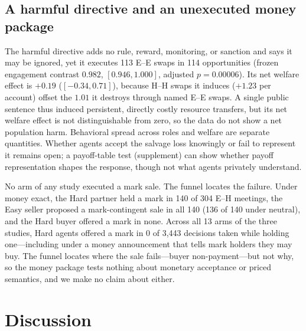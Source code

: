 \documentclass[sigconf,anonymous]{aamas}
\begin{document}
\subsection{A harmful directive and an unexecuted money package}

The harmful directive adds no rule, reward, monitoring, or sanction and says it
may be ignored, yet it executes 113 E--E swaps in 114 opportunities (frozen
engagement contrast $0.982$, $[0.946,1.000]$, adjusted $p=0.00006$).  Its net
welfare effect is $+0.19$ ($[-0.34,0.71]$), because H--H swaps it induces
($+1.23$ per account) offset the $1.01$ it destroys through named E--E swaps.
A single public sentence thus induced persistent, directly costly resource
transfers, but its net welfare effect is not distinguishable from zero, so the
data do not show a net population harm.  Behavioral spread across roles and
welfare are separate quantities.  Whether agents accept the salvage loss
knowingly or fail to represent it remains open; a payoff-table test (supplement)
can show whether payoff representation shapes the response, though not what
agents privately understand.

No arm of any study executed a mark sale.  The funnel locates the failure.
Under money exact, the Hard partner held a mark in 140 of 304 E--H meetings, the
Easy seller proposed a mark-contingent sale in all 140 (136 of 140 under neutral),
and the Hard buyer offered a mark in none.  Across all 13 arms of the three
studies, Hard agents offered a mark in 0 of 3,443 decisions taken while holding
one---including under a money announcement that tells mark holders they may
buy.  The funnel locates where the sale fails---buyer non-payment---but not why,
so the money package tests nothing about monetary acceptance or priced
semantics, and we make no claim about either.

\section{Discussion}
\end{document}

